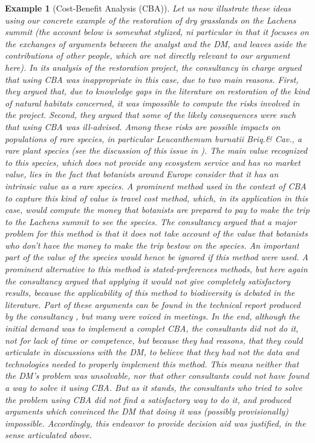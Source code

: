 \documentclass[preprint, french, english, 11pt, authoryear]{elsarticle}%
\newtheorem{example}{Example}
\begin{document}
\begin{example}[Cost-Benefit Analysis (CBA)]
Let us now illustrate these ideas using our concrete example of the restoration of dry grasslands on the Lachens summit (the account below is somewhat stylized, ni particular in that it focuses on the exchanges of arguments between the analyst and the \ac{DM}, and leaves aside the contributions of other people, which are not directly relevant to our argument here). In its analysis of the restoration project, the consultancy in charge argued that using CBA was inappropriate in this case, due to two main reasons. First, they argued that, due to knowledge gaps in the literature on restoration of the kind of natural habitats concerned, it was impossible to compute the risks involved in the project. Second, they argued that some of the likely consequences were such that using CBA was ill-advised. Among these risks are possible impacts on populations of rare species, in particular \emph{Leucanthemum burnatii} Briq.\@ \& Cav.\@, a rare plant species (see the discussion of this issue in \cite{meinard_ethical_2016}). The main value recognized to this species, which does not provide any ecosystem service and has no market value, lies in the fact that botanists around Europe consider that it has an intrinsic value as a rare species. A prominent method used in the context of CBA to capture this kind of value is travel cost method, which, in its application in this case, would compute the money that botanists are prepared to pay to make the trip to the Lachens summit to see the species. The consultancy argued that a major problem for this method is that it does not take account of the value that botanists who don't have the money to make the trip bestow on the species. An important part of the value of the species would hence be ignored if this method were used. A prominent alternative to this method is stated-preferences methods, but here again the consultancy argued that applying it would not give completely satisfactory results, because the applicability of this method to biodiversity is debated in the literature. Part of these arguments can be found in the technical report produced by the consultancy \citep{meinard_etude_2015}, but many were voiced in meetings. In the end, although the initial demand was to implement a complet CBA, the consultants did not do it, not for lack of time or competence, but because they had reasons, that they could articulate in discussions with the \ac{DM}, to believe that they had not the data and technologies needed to properly implement this method. This means neither that the \ac{DM}'s problem was unsolvable, nor that other consultants could not have found a way to solve it using CBA. But as it stands, the consultants who tried to solve the problem using CBA did not find a satisfactory way to do it, and produced arguments which convinced the \ac{DM} that doing it was (possibly provisionally) impossible. Accordingly, this endeavor to provide decision aid was justified, in the sense articulated above.
\end{example}
\end{document}
